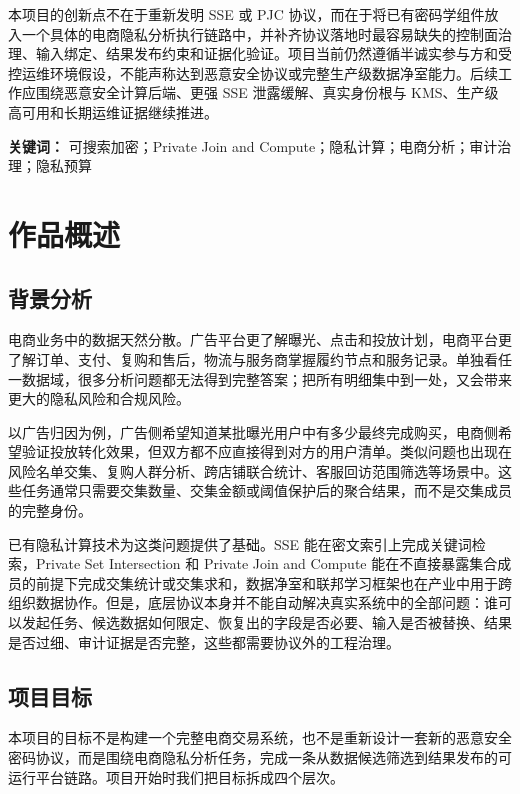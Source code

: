 \documentclass[UTF8,a4paper,12pt,oneside]{ctexrep}
\begin{document}
本项目的创新点不在于重新发明 SSE 或 PJC 协议，而在于将已有密码学组件放入一个具体的电商隐私分析执行链路中，并补齐协议落地时最容易缺失的控制面治理、输入绑定、结果发布约束和证据化验证。项目当前仍然遵循半诚实参与方和受控运维环境假设，不能声称达到恶意安全协议或完整生产级数据净室能力。后续工作应围绕恶意安全计算后端、更强 SSE 泄露缓解、真实身份根与 KMS、生产级高可用和长期运维证据继续推进。

\vspace{1em}
\noindent\textbf{关键词：} 可搜索加密；Private Join and Compute；隐私计算；电商分析；审计治理；隐私预算

\tableofcontents
\clearpage
{}

\chapter{作品概述}

\section{背景分析}

电商业务中的数据天然分散。广告平台更了解曝光、点击和投放计划，电商平台更了解订单、支付、复购和售后，物流与服务商掌握履约节点和服务记录。单独看任一数据域，很多分析问题都无法得到完整答案；把所有明细集中到一处，又会带来更大的隐私风险和合规风险。

以广告归因为例，广告侧希望知道某批曝光用户中有多少最终完成购买，电商侧希望验证投放转化效果，但双方都不应直接得到对方的用户清单。类似问题也出现在风险名单交集、复购人群分析、跨店铺联合统计、客服回访范围筛选等场景中。这些任务通常只需要交集数量、交集金额或阈值保护后的聚合结果，而不是交集成员的完整身份。

已有隐私计算技术为这类问题提供了基础。SSE 能在密文索引上完成关键词检索\cite{curtmola2006sse,cash2014dynamic}，Private Set Intersection 和 Private Join and Compute 能在不直接暴露集合成员的前提下完成交集统计或交集求和\cite{googlepjc,wiredpjc}，数据净室和联邦学习框架也在产业中用于跨组织数据协作\cite{awscleanrooms,fate,secretflow}。但是，底层协议本身并不能自动解决真实系统中的全部问题：谁可以发起任务、候选数据如何限定、恢复出的字段是否必要、输入是否被替换、结果是否过细、审计证据是否完整，这些都需要协议外的工程治理。

\section{项目目标}

本项目的目标不是构建一个完整电商交易系统，也不是重新设计一套新的恶意安全密码协议，而是围绕电商隐私分析任务，完成一条从数据候选筛选到结果发布的可运行平台链路。项目开始时我们把目标拆成四个层次。
\end{document}
